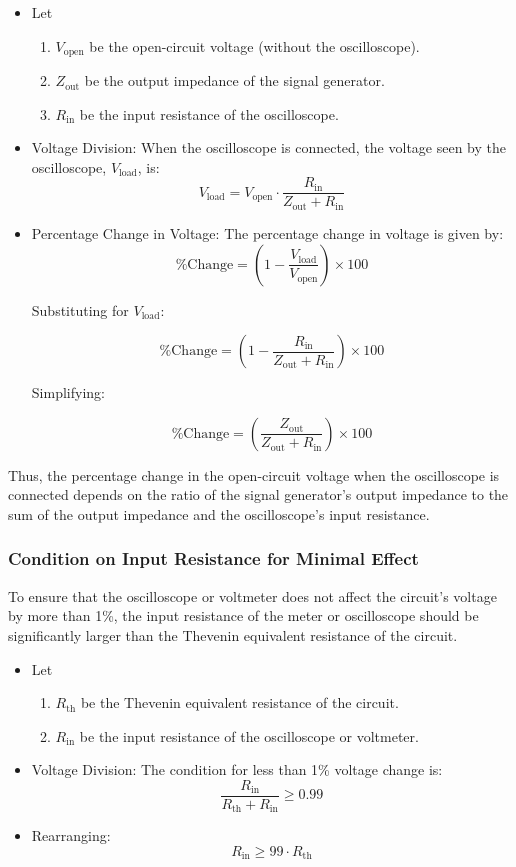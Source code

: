 \documentclass{article}
\begin{document}
\begin{itemize}
	\item Let
	\begin{enumerate}
		\item \( V_{\text{open}} \) be the open-circuit voltage (without the oscilloscope).
		\item \( Z_{\text{out}} \) be the output impedance of the signal generator.
		\item \( R_{\text{in}} \) be the input resistance of the oscilloscope.
	\end{enumerate}
	\item Voltage Division: When the oscilloscope is connected, the voltage seen by the oscilloscope, \( V_{\text{load}} \), is:
	\[
	V_{\text{load}} = V_{\text{open}} \cdot \frac{R_{\text{in}}}{Z_{\text{out}} + R_{\text{in}}}
	\]
	\item Percentage Change in Voltage: The percentage change in voltage is given by:
	\[
	\% \text{Change} = \left( 1 - \frac{V_{\text{load}}}{V_{\text{open}}} \right) \times 100
	\]
	
	Substituting for \( V_{\text{load}} \):
	
	\[
	\% \text{Change} = \left( 1 - \frac{R_{\text{in}}}{Z_{\text{out}} + R_{\text{in}}} \right) \times 100
	\]
	
	Simplifying:
	
	\[
	\% \text{Change} = \left( \frac{Z_{\text{out}}}{Z_{\text{out}} + R_{\text{in}}} \right) \times 100
	\]
\end{itemize}

Thus, the percentage change in the open-circuit voltage when the oscilloscope is connected depends on the ratio of the signal generator's output impedance to the sum of the output impedance and the oscilloscope's input resistance.

\subsubsection*{Condition on Input Resistance for Minimal Effect}

To ensure that the oscilloscope or voltmeter does not affect the circuit's voltage by more than 1\%, the input resistance of the meter or oscilloscope should be significantly larger than the Thevenin equivalent resistance of the circuit.

\begin{itemize}
	\item Let
	\begin{enumerate}
		\item \( R_{\text{th}} \) be the Thevenin equivalent resistance of the circuit.
		\item \( R_{\text{in}} \) be the input resistance of the oscilloscope or voltmeter.
	\end{enumerate}
	\item Voltage Division: The condition for less than 1\% voltage change is:
	\[
   	\frac{R_{\text{in}}}{R_{\text{th}} + R_{\text{in}}} \geq 0.99
   	\]
	\item Rearranging:
	\[
	R_{\text{in}} \geq 99 \cdot R_{\text{th}}
	\]
\end{itemize}
\end{document}
